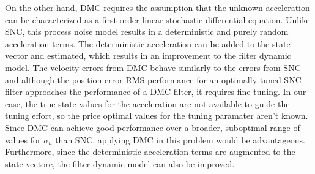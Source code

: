 \documentclass[11pt]{article}
\begin{document}
On the other hand, DMC requires the assumption that the unknown acceleration can be characterized as a first-order linear stochastic differential equation.  Unlike SNC, this process noise model results in a deterministic and purely random acceleration terms.  The deterministic acceleration can be added to the state vector and estimated, which results in an improvement to the filter dynamic model.  The velocity errors from DMC behave similarly to the errors from SNC and although the position error RMS performance for an optimally tuned SNC filter approaches the performance of a DMC filter, it requires fine tuning.  In our case, the true state values for the acceleration are not available to guide the tuning effort, so the price optimal values for the tuning paramater aren't known.  Since DMC can achieve good performance over a broader, suboptimal range of values for $\sigma_u$ than SNC, applying DMC in this problem would be advantageous.  Furthermore, since the deterministic acceleration terms are augmented to the state vectore, the filter dynamic model can also be improved.
\end{document}
